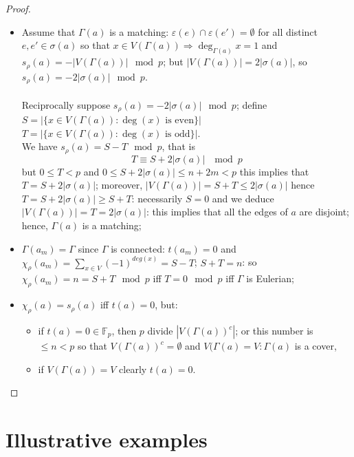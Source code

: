 \documentclass[preprint,12pt,authoryear]{elsarticle}
\theoremstyle{definition}
\begin{document}
\begin{proof}\textrm{}
\begin{itemize}
\item[i)]  Assume that $\Gamma(a)$ is a matching: $\varepsilon(e) \cap \varepsilon(e')= \emptyset$ for all distinct $e,e' \in \sigma(a)$ so that $x \in V(\Gamma(a))  \Longrightarrow \deg_{\Gamma(a)}x=1$ and $s_{\rho}(a) =- |V(\Gamma(a))| \mod p$; but 
$| V(\Gamma(a))  |=  2 |\sigma(a)|$,  so $s_{\rho}(a)=-2 |\sigma(a)| \mod p$.\\\\
Reciprocally  suppose $s_{\rho}(a)=-2 |\sigma(a)| \mod p$; define \\
$S=| \{ x \in V(\Gamma(a)) : \deg(x)  \text{ is even} \}|$\\
$T=| \{ x \in V(\Gamma(a)) : \deg(x)   \text{ is odd} \}|.$\\
We have $s_{\rho}(a)= S-T \mod p$, that is 
\[
T \equiv S+ 2 |\sigma(a)| \; \mod p
\]
but $0 \le T <p$ and $0 \le S+2|\sigma(a)| \le n+2m <p$ this implies that $ T= S+ 2 |\sigma(a)|$; moreover, 
$|V(\Gamma(a))|=S+T \le 2 |\sigma(a)|$ hence $T=S+2|\sigma(a)| \ge S+T$: necessarily $S=0$ and we deduce 
$|V(\Gamma(a))| =T=2 |\sigma(a)|$: this implies that all the edges of $a$ are disjoint; hence, $\Gamma(a)$ is a  matching;
\item[ii)]  $\Gamma(a_m)= \Gamma$ since $\Gamma$ is connected: $t(a_m)=0$ and $\chi_{\rho}(a_m)=\sum_{x \in V} (-1)^{deg(x)}=S-T$; $S+T=n$: so $\chi_{\rho}(a_m)=n=S+T \mod p $ iff $T=0  \mod p$  iff $\Gamma$ is Eulerian;
\item[iii)]  $\chi_{\rho}(a)=s_{\rho}(a)$ iff $t(a)=0$, but:
\begin{itemize}
\item[-]  if $t(a)=0 \in \mathbb{F}_p$, then $p$ divide $|V(\Gamma(a))^c|$; or this number is $\le n <p $ so that $V(\Gamma(a))^c= \emptyset$ and $V(\Gamma(a)=V: \Gamma(a)$ is a cover,
\item[-]  if $V(\Gamma(a))=V$ clearly $t(a)=0$. 
\end{itemize}

\end{itemize}
 \end{proof}




\section{Illustrative examples}
\end{document}
